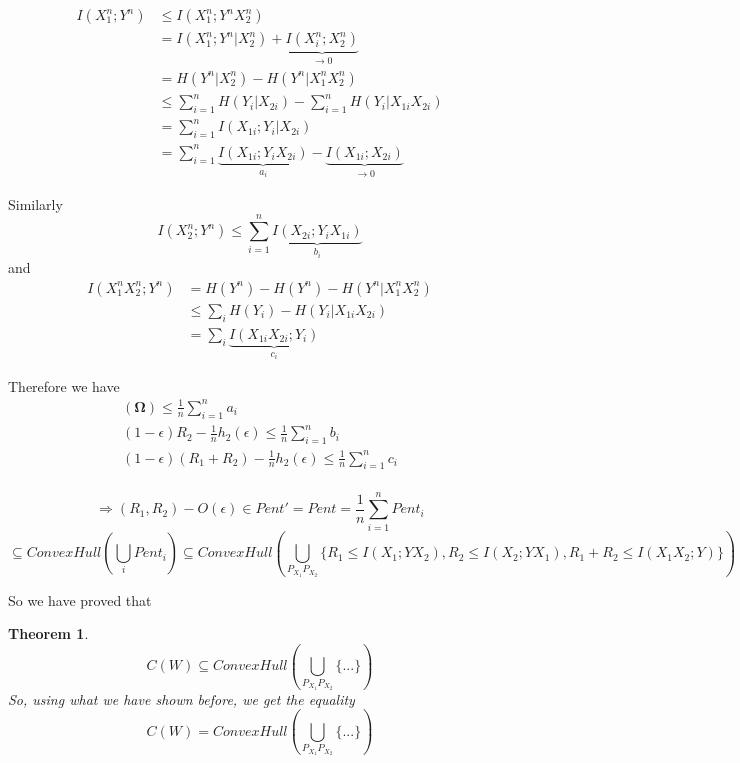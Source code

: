 \documentclass[twoside]{article}
\newtheorem{theorem}{Theorem}[section]
\theoremstyle{definition} %
\begin{document}
\begin{align*}
  I(X_1^n ; Y^n) &\leq I(X_1^n ; Y^n X_2^n) \\
                 &= I(X_1^n ; Y^n | X_2^n) + \underbrace{I(X_i^n ; X_2^n)}_{\to 0} \\
                 &= H(Y^n | X_2^n) - H(Y^n | X_1^n X_2^n) \\
                 &\leq \sum_{i = 1}^n H(Y_i | X_{2i}) - \sum_{i = 1}^n H(Y_i | X_{1i} X_{2i}) \\
                 &= \sum_{i = 1}^n I(X_{1i} ; Y_i | X_{2i}) \\
                 &= \sum_{i = 1}^n \underbrace{I(X_{1i} ; Y_i X_{2i})}_{a_i} - \underbrace{I(X_{1i} ; X_{2i})}_{\to 0}
\end{align*}

Similarly
\[
  I(X_2^n ; Y^n) \leq \sum_{i = 1}^n \underbrace{I(X_{2i} ; Y_i X_{1i})}_{b_i}
\]
and
\begin{align*}
  I(X_1^n X_2^n ; Y^n) &= H(Y^n) - H(Y^n) - H(Y^n | X_1^n X_2^n ) \\
                       &\leq \sum_i H(Y_i) - H(Y_i | X_{1i} X_{2i}) \\
                       &= \sum_i \underbrace{I(X_{1i} X_{2i} ; Y_i)}_{c_i}
\end{align*}

Therefore we have
\begin{align*}
  \mathbf{(\Omega)} \leq \frac{1}{n} \sum_{i=1}^n a_i \\
  (1 - \epsilon) R_2 - \frac{1}{n} h_2(\epsilon) \leq \frac{1}{n} \sum_{i=1}^n b_i \\
  (1 - \epsilon) (R_1 + R_2) - \frac{1}{n} h_2(\epsilon) \leq \frac{1}{n} \sum_{i=1}^n c_i \\
\end{align*}

\[
  \Rightarrow (R_1, R_2) - O(\epsilon) \in Pent' = Pent = \frac{1}{n} \sum_{i=1}^n Pent_i
\]
\[
  \subseteq ConvexHull(\bigcup_i Pent_i) \subseteq ConvexHull(\bigcup_{P_{X_1} P_{X_2}} \{ R_1 \leq I(X_1 ; Y X_2),  R_2 \leq I(X_2 ; Y X_1),  R_1 + R_2 \leq I(X_1 X_2 ; Y)\})
\]

So we have proved that

\begin{theorem}
  \[
    C(W) \subseteq ConvexHull(\bigcup_{P_{X_1} P_{X_2}} \{...\})
  \]
  So, using what we have shown before, we get the equality
  \[
    C(W) = ConvexHull(\bigcup_{P_{X_1} P_{X_2}} \{...\})
  \]
\end{theorem}
\end{document}
